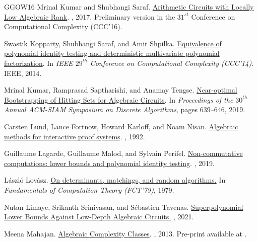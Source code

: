 \documentclass[10pt,a4paper]{article}
\numberwithin{equation}{section}
\begin{document}
\begin{thebibliography}{GGOW16}
Mrinal Kumar and Shubhangi Saraf.
\newblock \href{http://www.theoryofcomputing.org/articles/v013a006/}{Arithmetic
  Circuits with Locally Low Algebraic Rank}.
, 2017.
\newblock Preliminary version in the $31^{st}$ Conference on Computational
  Complexity (CCC'16).

Swastik Kopparty, Shubhangi Saraf, and Amir Shpilka.
\newblock \href{https://ieeexplore.ieee.org/document/6875486}{Equivalence of
  polynomial identity testing and deterministic multivariate polynomial
  factorization}.
\newblock In {\em {IEEE} $29^{th}$ Conference on Computational Complexity
  (CCC'14)}. IEEE, 2014.

Mrinal Kumar, Ramprasad Saptharishi, and Anamay Tengse.
\newblock \href{https://dl.acm.org/doi/10.5555/3310435.3310475}{Near-optimal
  {B}ootstrapping of {H}itting {S}ets for {A}lgebraic {C}ircuits}.
\newblock In {\em Proceedings of the $30^{th}$ Annual ACM-SIAM Symposium on
  Discrete Algorithms}, pages 639--646, 2019.

Carsten Lund, Lance Fortnow, Howard Karloff, and Noam Nisan.
\newblock \href{https://dl.acm.org/doi/abs/10.1145/146585.146605}{Algebraic
  methods for interactive proof systems}.
, 1992.

Guillaume Lagarde, Guillaume Malod, and Sylvain Perifel.
\newblock
  \href{http://cjtcs.cs.uchicago.edu/articles/2019/2/cj19-02.pdf}{Non-commutative
  computations: lower bounds and polynomial identity testing}.
, 2019.

L{\'a}szl{\'o} Lov{\'a}sz.
\newblock
  \href{http://www.math.uwaterloo.ca/~harvey/W11/1979-Lovasz-OnDeterminantsMatchingsAndRandomAlgs.pdf}{On
  determinants, matchings, and random algorithms.}
\newblock In {\em Fundamentals of Computation Theory (FCT'79)}, 1979.

Nutan Limaye, Srikanth Srinivasan, and S{\'e}bastien Tavenas.
\newblock \href{https://eccc.weizmann.ac.il/report/2021/081/}{Superpolynomial
  Lower Bounds Against Low-Depth Algebraic Circuits.}
, 2021.

Meena Mahajan.
\newblock \href {http://arxiv.org/abs/1307.3863} {Algebraic Complexity
  Classes}.
, 2013.
\newblock Pre-print available at \href {http://arxiv.org/abs/1307.3863}
  {}.


\end{thebibliography}
\end{document}
